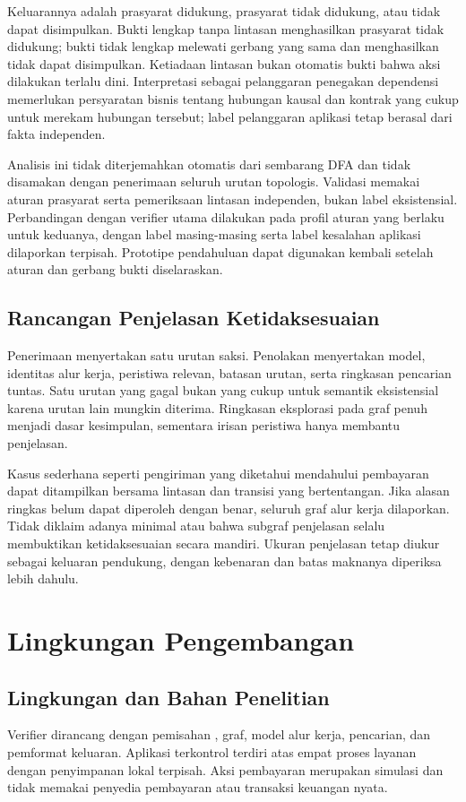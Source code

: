Keluarannya adalah prasyarat didukung, prasyarat tidak didukung, atau tidak dapat disimpulkan. Bukti lengkap tanpa lintasan menghasilkan prasyarat tidak didukung; bukti tidak lengkap melewati gerbang yang sama dan menghasilkan tidak dapat disimpulkan. Ketiadaan lintasan bukan otomatis bukti bahwa aksi dilakukan terlalu dini. Interpretasi sebagai pelanggaran penegakan dependensi memerlukan persyaratan bisnis tentang hubungan kausal dan kontrak yang cukup untuk merekam hubungan tersebut; label pelanggaran aplikasi tetap berasal dari fakta independen.

Analisis ini tidak diterjemahkan otomatis dari sembarang DFA dan tidak disamakan dengan penerimaan seluruh urutan topologis. Validasi memakai aturan prasyarat serta pemeriksaan lintasan independen, bukan label eksistensial. Perbandingan dengan verifier utama dilakukan pada profil aturan yang berlaku untuk keduanya, dengan label masing-masing serta label kesalahan aplikasi dilaporkan terpisah. Prototipe pendahuluan dapat digunakan kembali setelah aturan dan gerbang bukti diselaraskan.

\subsection{Rancangan Penjelasan Ketidaksesuaian}
Penerimaan menyertakan satu urutan saksi. Penolakan menyertakan model, identitas alur kerja, peristiwa relevan, batasan urutan, serta ringkasan pencarian tuntas. Satu urutan yang gagal bukan  yang cukup untuk semantik eksistensial karena urutan lain mungkin diterima. Ringkasan eksplorasi pada graf penuh menjadi dasar kesimpulan, sementara irisan peristiwa hanya membantu penjelasan.

Kasus sederhana seperti pengiriman yang diketahui mendahului pembayaran dapat ditampilkan bersama lintasan dan transisi yang bertentangan. Jika alasan ringkas belum dapat diperoleh dengan benar, seluruh graf alur kerja dilaporkan. Tidak diklaim adanya  minimal atau bahwa subgraf penjelasan selalu membuktikan ketidaksesuaian secara mandiri. Ukuran penjelasan tetap diukur sebagai keluaran pendukung, dengan kebenaran dan batas maknanya diperiksa lebih dahulu.

\section{Lingkungan Pengembangan}
\subsection{Lingkungan dan Bahan Penelitian}
Verifier dirancang dengan pemisahan , graf, model alur kerja, pencarian, dan pemformat keluaran. Aplikasi terkontrol terdiri atas empat proses layanan dengan penyimpanan lokal terpisah. Aksi pembayaran merupakan simulasi dan tidak memakai penyedia pembayaran atau transaksi keuangan nyata.

